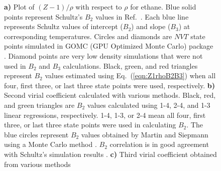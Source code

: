 \documentclass[5p,times]{elsarticle}
\begin{document}
\begin{figure}
\caption{
\textbf{a)} Plot of $(Z-1)/\rho$ with respect to $\rho$ for ethane. Blue solid points represent Schultz's $B_2$ values in Ref.~\cite{Ahunbay2004}. Each blue line represents Schultz values of intercept ($B_2$) and slope ($B_3$) at corresponding temperatures. Circles and diamonds are $NVT$ state points simulated in GOMC (GPU Optimized Monte Carlo) package \cite{Mick2013}. Diamond points are very low density simulations that were not used in $B_2$ and $B_3$ calculations. Black, green, and red triangles represent $B_2$ values estimated using Eq.~(\ref{eqn:Z1rhoB2B3}) when all four, first three, or last three state points were used, respectively.
\textbf{b)} Second virial coefficient calculated with various methods. Black, red, and green triangles are $B_2$ values calculated using 1-4, 2-4, and 1-3 linear regressions, respectively. 1-4, 1-3, or 2-4 mean all four, first three, or last three state points were used in calculating $B_2$. The blue circles represent $B_2$ values obtained by Martin and Siepmann \cite{Martin1998} using a Monte Carlo method \cite{Harismiadis1994}. $B_2$ correlation is in good agreement with Schultz's simulation results \cite{Schultz2010a}.
\textbf{c)} Third virial coefficient obtained from various methods
}
\label{fig:TraPPE-C2-Z1rho-B2-B3}
\end{figure}
\end{document}
